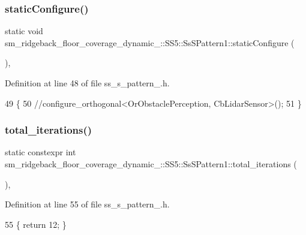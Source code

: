 \subsubsection{\texorpdfstring{static\+Configure()}{staticConfigure()}}
{\footnotesize\ttfamily static void sm\+\_\+ridgeback\+\_\+floor\+\_\+coverage\+\_\+dynamic\+\_\+::\+S\+S5\+::\+Ss\+S\+Pattern1\+::static\+Configure (\begin{DoxyParamCaption}{ }\end{DoxyParamCaption})\hspace{0.3cm}{\ttfamily [inline]}, {\ttfamily [static]}}



Definition at line 48 of file ss\+\_\+s\+\_\+pattern\+\_.\+h.


\begin{DoxyCode}
49     \{
50         \textcolor{comment}{//configure\_orthogonal<OrObstaclePerception, CbLidarSensor>();}
51     \}
\end{DoxyCode}
\mbox{\label{structsm__ridgeback__floor__coverage__dynamic__1_1_1SS5_1_1SsSPattern1_a41bd5d1e49e44522ac0fe3eac24cdcb6}} 
\subsubsection{\texorpdfstring{total\+\_\+iterations()}{total\_iterations()}}
{\footnotesize\ttfamily static constexpr int sm\+\_\+ridgeback\+\_\+floor\+\_\+coverage\+\_\+dynamic\+\_\+::\+S\+S5\+::\+Ss\+S\+Pattern1\+::total\+\_\+iterations (\begin{DoxyParamCaption}{ }\end{DoxyParamCaption})\hspace{0.3cm}{\ttfamily [inline]}, {\ttfamily [static]}}



Definition at line 55 of file ss\+\_\+s\+\_\+pattern\+\_.\+h.


\begin{DoxyCode}
55 \{ \textcolor{keywordflow}{return} 12; \}
\end{DoxyCode}


